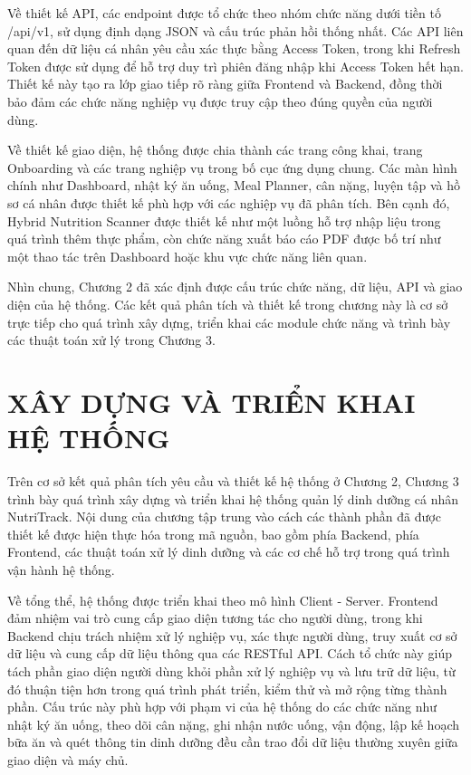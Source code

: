 \documentclass[12pt, a4paper]{report}
\begin{document}
Về thiết kế API, các endpoint được tổ chức theo nhóm chức năng dưới tiền tố /api/v1, sử dụng định dạng JSON và cấu trúc phản hồi thống nhất. Các API liên quan đến dữ liệu cá nhân yêu cầu xác thực bằng Access Token, trong khi Refresh Token được sử dụng để hỗ trợ duy trì phiên đăng nhập khi Access Token hết hạn. Thiết kế này tạo ra lớp giao tiếp rõ ràng giữa Frontend và Backend, đồng thời bảo đảm các chức năng nghiệp vụ được truy cập theo đúng quyền của người dùng.

Về thiết kế giao diện, hệ thống được chia thành các trang công khai, trang Onboarding và các trang nghiệp vụ trong bố cục ứng dụng chung. Các màn hình chính như Dashboard, nhật ký ăn uống, Meal Planner, cân nặng, luyện tập và hồ sơ cá nhân được thiết kế phù hợp với các nghiệp vụ đã phân tích. Bên cạnh đó, Hybrid Nutrition Scanner được thiết kế như một luồng hỗ trợ nhập liệu trong quá trình thêm thực phẩm, còn chức năng xuất báo cáo PDF được bố trí như một thao tác trên Dashboard hoặc khu vực chức năng liên quan.

Nhìn chung, Chương 2 đã xác định được cấu trúc chức năng, dữ liệu, API và giao diện của hệ thống. Các kết quả phân tích và thiết kế trong chương này là cơ sở trực tiếp cho quá trình xây dựng, triển khai các module chức năng và trình bày các thuật toán xử lý trong Chương 3.


\chapter{XÂY DỰNG VÀ TRIỂN KHAI HỆ THỐNG}
Trên cơ sở kết quả phân tích yêu cầu và thiết kế hệ thống ở Chương 2, Chương 3 trình bày quá trình xây dựng và triển khai hệ thống quản lý dinh dưỡng cá nhân NutriTrack. Nội dung của chương tập trung vào cách các thành phần đã được thiết kế được hiện thực hóa trong mã nguồn, bao gồm phía Backend, phía Frontend, các thuật toán xử lý dinh dưỡng và các cơ chế hỗ trợ trong quá trình vận hành hệ thống.

Về tổng thể, hệ thống được triển khai theo mô hình Client - Server. Frontend đảm nhiệm vai trò cung cấp giao diện tương tác cho người dùng, trong khi Backend chịu trách nhiệm xử lý nghiệp vụ, xác thực người dùng, truy xuất cơ sở dữ liệu và cung cấp dữ liệu thông qua các RESTful API. Cách tổ chức này giúp tách phần giao diện người dùng khỏi phần xử lý nghiệp vụ và lưu trữ dữ liệu, từ đó thuận tiện hơn trong quá trình phát triển, kiểm thử và mở rộng từng thành phần. Cấu trúc này phù hợp với phạm vi của hệ thống do các chức năng như nhật ký ăn uống, theo dõi cân nặng, ghi nhận nước uống, vận động, lập kế hoạch bữa ăn và quét thông tin dinh dưỡng đều cần trao đổi dữ liệu thường xuyên giữa giao diện và máy chủ.
\end{document}
